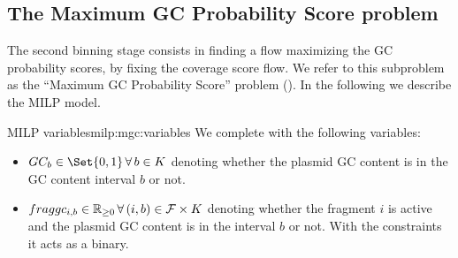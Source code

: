 \subsection{The Maximum GC Probability Score problem \MGC{}}\label{sec:method:mgc}

The second binning stage consists in finding a flow maximizing the GC probability scores, by fixing the coverage score flow.
We refer to this subproblem as the \enquote{Maximum GC Probability Score} problem (\MGC{}).
In the following we describe the MILP model.

\begin{definition}{\MGC{} MILP variables}{milp:mgc:variables}
  We complete  with the following variables:
  \begin{itemize}
    \item \(GC_b \in \Set{0, 1} \, \forall b \in K\) denoting whether the plasmid GC content is in the GC content interval \(b\) or not.
    \item \(\fraggc{i}{b} \in \Reals_{\geq 0} \, \forall (i, b) \in \Fragments{} \times K\) denoting whether the fragment \(i\) is active and the plasmid GC content is in the interval \(b\) or not. With the constraints it acts as a binary.
  \end{itemize}
\end{definition}

